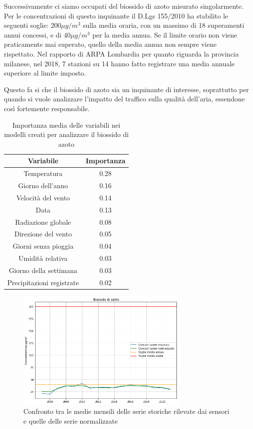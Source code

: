 Successivamente ci siamo occupati del biossido di azoto misurato singolarmente. Per le concentrazioni di questo inquinante il D.Lgs 155/2010 ha stabilito le seguenti soglie: 200$\mu g/m^3$ sulla media oraria, con un massimo di 18 superamenti annui concessi, e di 40$\mu g/m^3$ per la media annua. Se il limite orario non viene praticamente mai superato, quello della media annua non sempre viene rispettato. Nel rapporto di ARPA Lombardia \cite{arpa2018rapporto} per quanto riguarda la provincia milanese, nel 2018, 7 stazioni su 14 hanno fatto registrare una media annuale superiore al limite imposto.

Questo fa si che il biossido di azoto sia un inquinante di interesse, soprattutto per quando si vuole analizzare l'impatto del traffico sulla qualità dell'aria, essendone così fortemente responsabile.

\begin{table}[h!]
\centering
\begin{tabular}{ |c c| }
	\hline
	Variabile & Importanza \\
	\hline
	Temperatura & 0.28 \\
	Giorno dell'anno & 0.16 \\
	Velocità del vento & 0.14 \\
	Data & 0.13 \\
	Radiazione globale & 0.08 \\
	Direzione del vento & 0.05 \\
	Giorni senza pioggia & 0.04 \\
	Umidità relativa & 0.03 \\
	Giorno della settimana & 0.03 \\
	Precipitazioni registrate & 0.02 \\
	\hline
\end{tabular}
\caption{Importanza media delle variabili nei modelli creati per analizzare il biossido di azoto}
\label{table:importanza_no2}
\end{table}

\begin{figure}[h]
\centering
\includegraphics[width=0.75\textwidth]{no2_medie_annuali}
\caption{Confronto tra le medie mensili delle serie storiche rilevate dai sensori e quelle delle serie normalizzate}
\label{fig:no2_medie_annuali}
\end{figure}

